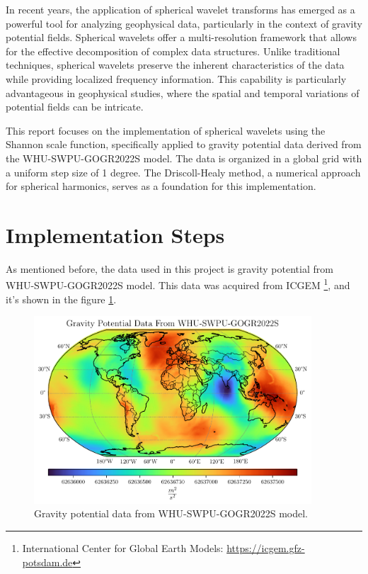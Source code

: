 \documentclass[12pt]{article}
\begin{document}
	In recent years, the application of spherical wavelet transforms has emerged as a powerful tool for analyzing geophysical data, particularly in the context of gravity potential fields. Spherical wavelets offer a multi-resolution framework that allows for the effective decomposition of complex data structures. Unlike traditional techniques, spherical wavelets preserve the inherent characteristics of the data while providing localized frequency information. This capability is particularly advantageous in geophysical studies, where the spatial and temporal variations of potential fields can be intricate. 
	
	This report focuses on the implementation of spherical wavelets using the Shannon scale function, specifically applied to gravity potential data derived from the WHU-SWPU-GOGR2022S model. The data is organized in a global grid with a uniform step size of 1 degree. The Driscoll-Healy method, a numerical approach for spherical harmonics, serves as a foundation for this implementation.
	
	\section{Implementation Steps}
	
	As mentioned before, the data used in this project is gravity potential from WHU-SWPU-GOGR2022S model. This data was acquired from ICGEM \footnote{International Center for Global Earth Models: \url{https://icgem.gfz-potsdam.de}}, and it's shown in the figure \ref{fig:MainData}.
	
	\begin{figure}[h!]
		\centering
		\includegraphics[height=7cm]{../Outputs/Plots/MainData.pdf}
		\caption{Gravity potential data from WHU-SWPU-GOGR2022S model.}
		\label{fig:MainData}
	\end{figure}
	
\end{document}
